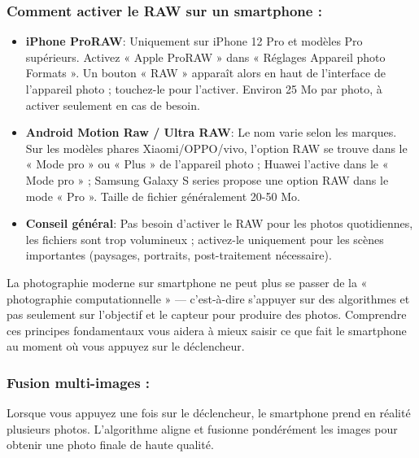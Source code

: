 \subsubsection*{Comment activer le RAW sur un smartphone :}

\begin{itemize}
  \item \textbf{iPhone ProRAW}: Uniquement sur iPhone 12 Pro et modèles Pro supérieurs. Activez « Apple ProRAW » dans « Réglages Appareil photo Formats ». Un bouton « RAW » apparaît alors en haut de l'interface de l'appareil photo ; touchez-le pour l'activer. Environ 25 Mo par photo, à activer seulement en cas de besoin.
  \item \textbf{Android Motion Raw / Ultra RAW}: Le nom varie selon les marques. Sur les modèles phares Xiaomi/OPPO/vivo, l'option RAW se trouve dans le « Mode pro » ou « Plus » de l'appareil photo ; Huawei l'active dans le « Mode pro » ; Samsung Galaxy S series propose une option RAW dans le mode « Pro ». Taille de fichier généralement 20-50 Mo.
  \item \textbf{Conseil général}: Pas besoin d'activer le RAW pour les photos quotidiennes, les fichiers sont trop volumineux ; activez-le uniquement pour les scènes importantes (paysages, portraits, post-traitement nécessaire).
\end{itemize}


La photographie moderne sur smartphone ne peut plus se passer de la « photographie computationnelle » — c'est-à-dire s'appuyer sur des algorithmes et pas seulement sur l'objectif et le capteur pour produire des photos. Comprendre ces principes fondamentaux vous aidera à mieux saisir ce que fait le smartphone au moment où vous appuyez sur le déclencheur.

\subsubsection*{Fusion multi-images :}

Lorsque vous appuyez une fois sur le déclencheur, le smartphone prend en réalité plusieurs photos. L'algorithme aligne et fusionne pondérément les images pour obtenir une photo finale de haute qualité.

